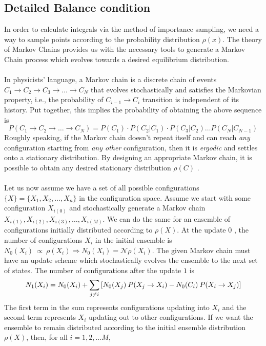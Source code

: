 \documentclass[../journal_main.tex]{subfiles}
\begin{document}
\subsection{Detailed Balance condition}
In order to calculate integrals via the method of importance sampling, we need a way to sample points according to the probability distribution $\rho(x)$. The theory of Markov Chains provides us with the necessary tools to generate a Markov Chain process which evolves towards a desired equilibrium distribution.~\\~\\
In physicists' language, a Markov chain is a discrete chain of events $C_1 \to C_2 \to C_3 \to \ldots \to C_N$ that evolves stochastically and satisfies the Markovian property, i.e., the probability of $C_{i-1} \to C_i$ transition is independent of its history. Put together, this implies the probability of obtaining the above sequence is
\begin{equation}
    P(C_1 \to C_2 \to\ldots \to C_N) = P(C_1)\cdot P(C_2 | C_1) \cdot P(C_3 | C_2) \ldots P(C_N | C_{N-1})
\end{equation}
Roughly speaking, if the Markov chain doesn't repeat itself and can reach \textit{any}  configuration starting from \textit{any other}  configuration, then it is \textit{ergodic} and settles onto a stationary distribution. By designing an appropriate Markov chain, it is possible to obtain any desired stationary distribution $\rho(C)$ .~\\~\\
Let us now assume we have a set of all possible configurations $\{X\} = \{X_1, X_2, \ldots, X_n\}$ in the configuration space. Assume we start with some configuration $X_{i(0)}$ and stochastically generate a Markov chain $X_{i(1)}, X_{i(2)}, X_{i(3)}, \ldots, X_{i(M)}$. We can do the same for an ensemble of configurations initially distributed according to $\rho(X)$. At the update $0$ , the number of configurations $X_i$ in the initial ensemble is $N_0(X_i) \: \propto \: \rho(X_i) \Rightarrow N_0 (X_i) = \mathcal{N} \rho(X_i)$. The given Markov chain must have an update scheme which stochastically evolves the ensemble to the next set of states. The number of configurations after the update $1$ is
\begin{equation}
    N_1(X_i) = N_0(X_i) + \sum_{j\neq i} \qty[N_0(X_j) \: P(X_j \to X_i) - N_0(C_i) \: P(X_i \to X_j)]
    \label{master}
\end{equation}
The first term in the sum represents configurations updating into $X_i$ and the second term represents $X_i$ updating out to other configurations. If we want the ensemble to remain distributed according to the initial ensemble distribution $\rho(X)$, then, for all $i = 1, 2, \ldots M$,
\end{document}
